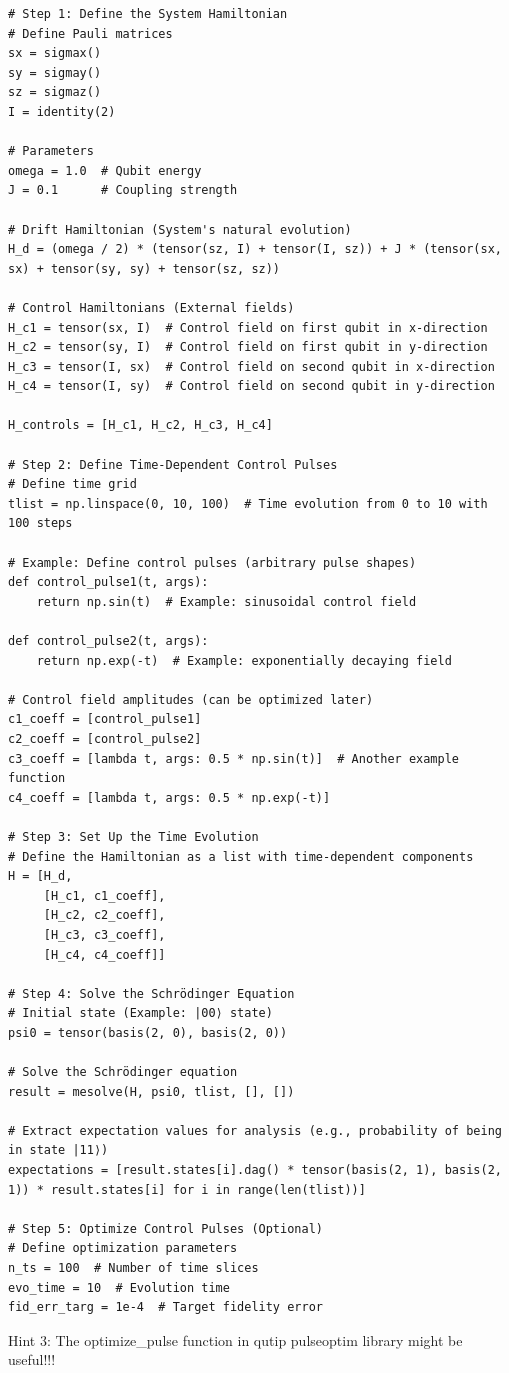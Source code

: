 \documentclass[12pt]{article}
\begin{document}
\begin{lstlisting}
# Step 1: Define the System Hamiltonian
# Define Pauli matrices
sx = sigmax()
sy = sigmay()
sz = sigmaz()
I = identity(2)

# Parameters
omega = 1.0  # Qubit energy
J = 0.1      # Coupling strength

# Drift Hamiltonian (System's natural evolution)
H_d = (omega / 2) * (tensor(sz, I) + tensor(I, sz)) + J * (tensor(sx, sx) + tensor(sy, sy) + tensor(sz, sz))

# Control Hamiltonians (External fields)
H_c1 = tensor(sx, I)  # Control field on first qubit in x-direction
H_c2 = tensor(sy, I)  # Control field on first qubit in y-direction
H_c3 = tensor(I, sx)  # Control field on second qubit in x-direction
H_c4 = tensor(I, sy)  # Control field on second qubit in y-direction

H_controls = [H_c1, H_c2, H_c3, H_c4]

# Step 2: Define Time-Dependent Control Pulses
# Define time grid
tlist = np.linspace(0, 10, 100)  # Time evolution from 0 to 10 with 100 steps

# Example: Define control pulses (arbitrary pulse shapes)
def control_pulse1(t, args):
    return np.sin(t)  # Example: sinusoidal control field

def control_pulse2(t, args):
    return np.exp(-t)  # Example: exponentially decaying field

# Control field amplitudes (can be optimized later)
c1_coeff = [control_pulse1]
c2_coeff = [control_pulse2]
c3_coeff = [lambda t, args: 0.5 * np.sin(t)]  # Another example function
c4_coeff = [lambda t, args: 0.5 * np.exp(-t)]

# Step 3: Set Up the Time Evolution
# Define the Hamiltonian as a list with time-dependent components
H = [H_d, 
     [H_c1, c1_coeff], 
     [H_c2, c2_coeff], 
     [H_c3, c3_coeff], 
     [H_c4, c4_coeff]]

# Step 4: Solve the Schrödinger Equation
# Initial state (Example: |00⟩ state)
psi0 = tensor(basis(2, 0), basis(2, 0))

# Solve the Schrödinger equation
result = mesolve(H, psi0, tlist, [], [])

# Extract expectation values for analysis (e.g., probability of being in state |11⟩)
expectations = [result.states[i].dag() * tensor(basis(2, 1), basis(2, 1)) * result.states[i] for i in range(len(tlist))]

# Step 5: Optimize Control Pulses (Optional)
# Define optimization parameters
n_ts = 100  # Number of time slices
evo_time = 10  # Evolution time
fid_err_targ = 1e-4  # Target fidelity error

\end{lstlisting}

Hint 3: The optimize\_pulse function in qutip pulseoptim library might be useful!!!
\end{document}
